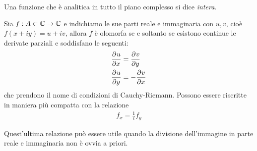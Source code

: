 \begin{definition}
  Una funzione che è analitica in tutto il piano complesso si dice \textit{intera}.
\end{definition}

\begin{theorem}
  Sia $ f:A\subset \mathbb{C} \to \mathbb{C} $ e indichiamo le sue parti reale e immaginaria con $ u,v $, cioè $ f(x + i y) = u + i v $, allora $ f $ è olomorfa se e 
  soltanto se esistono continue le derivate parziali e soddisfano le seguenti:
  \begin{align}
    &\frac{\partial^{} {u}}{\partial {x}^{}} = \frac{\partial^{} {v}}{\partial {y}^{}}
    \\
    &\frac{\partial^{} {u}}{\partial {y}^{}} = - \frac{\partial^{} {v}}{\partial {x}^{}}
  \end{align}
  che prendono il nome di condizioni di Cauchy-Riemann. Possono essere riscritte in maniera più compatta con la relazione 
  \begin{align}
    f_x = \frac1i f_y
  \end{align}
\end{theorem}
Quest'ultima relazione può essere utile quando la divisione dell'immagine in parte reale e immaginaria non è ovvia a priori.

